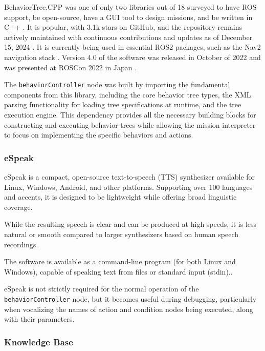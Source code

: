 \documentclass{CSSRforAfrica}
\begin{document}
BehaviorTree.CPP was one of only two libraries out of 18 surveyed to have ROS support, be open-source, have a GUI tool to design missions, and be written in C++ \cite{Iovino2020}. It is popular, with 3.1k stars on GitHub, and the repository remains actively maintained with continuous contributions and updates as of December 15, 2024 \cite{BehaviorTreeGithub}. It is currently being used in essential ROS2 packages, such as the Nav2 navigation stack \cite{ROSNavigation}. Version 4.0 of the software was released in October of 2022 and was presented at ROSCon 2022 in Japan \cite{ROSCon2022}.

The \texttt{\small behaviorController} node was built by importing the fundamental components from this library, including the core behavior tree types, the XML parsing functionality for loading tree specifications at runtime, and the tree execution engine. This dependency provides all the necessary building blocks for constructing and executing behavior trees while allowing the mission interpreter to focus on implementing the specific behaviors and actions.

\subsubsection{eSpeak}
eSpeak is a compact, open-source text-to-speech (TTS) synthesizer available for Linux, Windows, Android, and other platforms. Supporting over 100 languages and accents, it is designed to be lightweight while offering broad linguistic coverage.

While the resulting speech is clear and can be produced at high speeds, it is less natural or smooth compared to larger synthesizers based on human speech recordings.

The software is available as a command-line program (for both Linux and Windows), capable of speaking text from files or standard input (stdin).\cite{eSpeakWebsite}.

eSpeak is not strictly required for the normal operation of the \texttt{behaviorController} node, but it becomes useful during debugging, particularly when vocalizing the names of action and condition nodes being executed, along with their parameters.

\newpage
\subsubsection{Knowledge Base}
\end{document}
